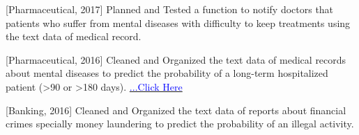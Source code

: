 \begin{cventries}
{\begin{cvitems}
        \item {[Pharmaceutical, 2017] Planned and Tested a function to notify doctors that patients who suffer from mental diseases with difficulty to keep treatments using the text data of medical record.}
        \item {[Pharmaceutical, 2016] Cleaned and Organized the text data of medical records about mental diseases to predict the probability of a long-term hospitalized patient (>90 or >180 days). \href{https://www.ibm.com/downloads/cas/VVYMQYLZ}{\textcolor{blue}{...Click Here}}}
        \item {[Banking, 2016] Cleaned and Organized the text data of reports about financial crimes specially money laundering to predict the probability of an illegal activity.}
      \end{cvitems}
    }
\end{cventries}
